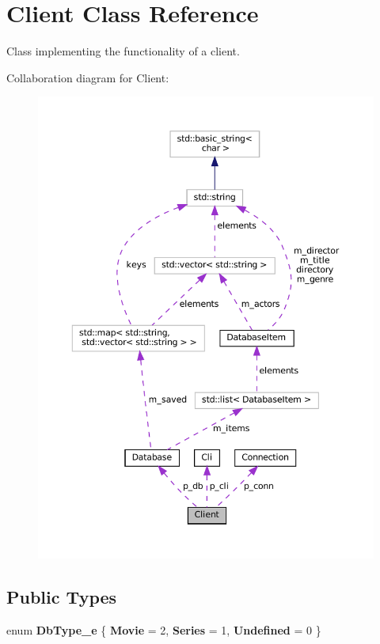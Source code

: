 \hypertarget{classClient}{}\section{Client Class Reference}
\label{classClient}


Class implementing the functionality of a client.  




Collaboration diagram for Client\+:
\nopagebreak
\begin{figure}[H]
\begin{center}
\leavevmode
\includegraphics[width=350pt]{classClient__coll__graph}
\end{center}
\end{figure}
\subsection*{Public Types}
\begin{DoxyCompactItemize}
\item 
\mbox{\label{classClient_a7312758312581aa3b543c2b65852d193}} 
enum {\bfseries Db\+Type\+\_\+e} \{ {\bfseries Movie} = 2, 
{\bfseries Series} = 1, 
{\bfseries Undefined} = 0
 \}
\end{DoxyCompactItemize}

